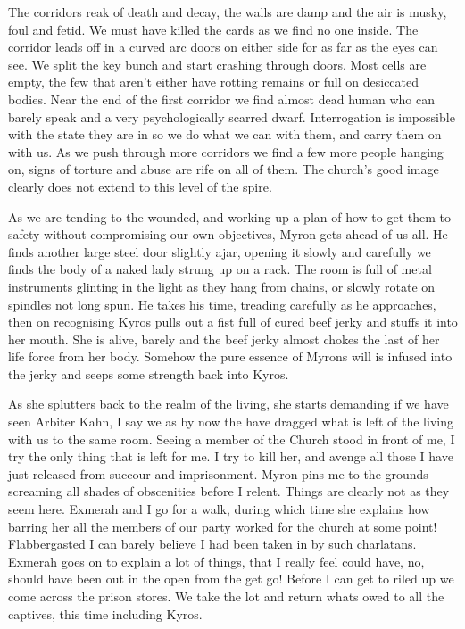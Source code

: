 The corridors reak of death and decay, the walls are damp and the air is musky, foul and fetid. We must have killed the cards as we find no one inside. The corridor leads off in a curved arc doors on either side for as far as the eyes can see. We split the key bunch and start crashing through doors. Most cells are empty, the few that aren’t either have rotting remains or full on desiccated bodies. Near the end of the first corridor we find almost dead human who can barely speak and a very psychologically scarred dwarf. Interrogation is impossible with the state they are in so we do what we can with them, and carry them on with us. As we push through more corridors we find a few more people hanging on, signs of torture and abuse are rife on all of them. The church's good image clearly does not extend to this level of the spire.\medskip

As we are tending to the wounded, and working up a plan of how to get them to safety without compromising our own objectives, Myron gets ahead of us all. He finds another large steel door slightly ajar, opening it slowly and carefully we finds the body of a naked lady strung up on a rack. The room is full of metal instruments glinting in the light as they hang from chains, or slowly rotate on spindles not long spun. He takes his time, treading carefully as he approaches, then on recognising Kyros pulls out a fist full of cured beef jerky and stuffs it into her mouth. She is alive, barely and the beef jerky almost chokes the last of her life force from her body. Somehow the pure essence of Myrons will is infused into the jerky and seeps some strength back into Kyros.\medskip

As she splutters back to the realm of the living, she starts demanding if we have seen Arbiter Kahn, I say we as by now the have dragged what is left of the living with us to the same room. Seeing a member of the Church stood in front of me, I try the only thing that is left for me. I try to kill her, and avenge all those I have just released from succour and imprisonment. Myron pins me to the grounds screaming all shades of obscenities before I relent. Things are clearly not as they seem here. Exmerah and I go for a walk, during which time she explains how barring her all the members of our party worked for the church at some point! Flabbergasted I can barely believe I had been taken in by such charlatans. Exmerah goes on to explain a lot of things, that I really feel could have, no, should have been out in the open from the get go! Before I can get to riled up we come across the prison stores. We take the lot and return whats owed to all the captives, this time including Kyros.\medskip

